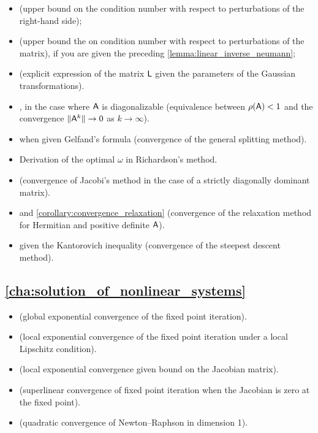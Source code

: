 \begin{itemize}
    \item {} (upper bound on the condition number with respect to perturbations of the right-hand side);
    \item {} (upper bound the on condition number with respect to perturbations of the matrix),
        if you are given the preceding \cref{lemma:linear_inverse_neumann};
    \item {} (explicit expression of the matrix $\mathsf L$ given the parameters of the Gaussian transformations).
    \item {},
        in the case where $\mathsf A$ is diagonalizable (equivalence between $\rho(\mathsf A) < 1$ and the convergence $\lVert\mathsf A^k\rVert \to 0$ as $k \to \infty$).

    \item {} when given Gelfand's formula (convergence of the general splitting method).
    \item Derivation of the optimal $\omega$ in Richardson's method.
    \item {} (convergence of Jacobi's method in the case of a strictly diagonally dominant matrix).
    \item {} and \cref{corollary:convergence_relaxation} (convergence of the relaxation method for Hermitian and positive definite $\mathsf A$).
    \item {} given the Kantorovich inequality (convergence of the steepest descent method).
\end{itemize}

\subsection*{\cref{cha:solution_of_nonlinear_systems}}%

\begin{itemize}
    \item {} (global exponential convergence of the fixed point iteration).
    \item {} (local exponential convergence of the fixed point iteration under a local Lipschitz condition).
    \item {}  (local exponential convergence given bound on the Jacobian matrix).
    \item {} (superlinear convergence of fixed point iteration when the Jacobian is zero at the fixed point).
    \item {} (quadratic convergence of Newton--Raphson in dimension 1).
\end{itemize}


